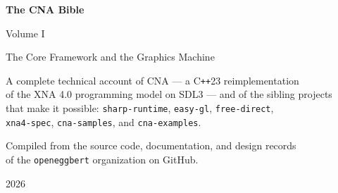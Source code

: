 \begin{titlepage}
\centering
\vspace*{3cm}
{\Huge\bfseries The CNA Bible\par}
\vspace{0.6cm}
{\Large Volume I \par}
{\large The Core Framework and the Graphics Machine\par}
\vspace{2.5cm}
{\large A complete technical account of CNA --- a C\texttt{++}23 reimplementation\\
of the XNA 4.0 programming model on SDL3 --- and of the sibling projects\\
that make it possible: \texttt{sharp-runtime}, \texttt{easy-gl}, \texttt{free-direct},\\
\texttt{xna4-spec}, \texttt{cna-samples}, and \texttt{cna-examples}.\par}
\vspace{3cm}
{\large Compiled from the source code, documentation, and design records\\
of the \texttt{openeggbert} organization on GitHub.\par}
\vfill
{\large 2026\par}
\end{titlepage}
